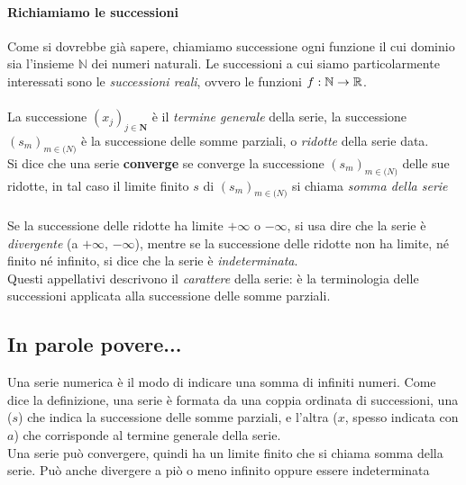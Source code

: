 \documentclass[12pt, a4paper, openany]{book}
\begin{document}
	\paragraph*{Richiamiamo le successioni}
	Come si dovrebbe già sapere, chiamiamo successione ogni funzione il cui dominio sia l'insieme $\mathbb{N}$ dei numeri naturali.
	Le successioni a cui siamo particolarmente interessati sono le \emph{successioni reali}, ovvero le funzioni $f : \mathbb{N} \rightarrow \mathbb{R}$.
	\paragraph*{}La successione $(x_j)_{j\in \mathbf{N}}$ è il \emph{termine generale} della serie, la successione $(s_m)_{m\in \mathbf(N)}$ è la successione delle somme parziali, o \emph{ridotte} della serie data.\\
	Si dice che una serie \textbf{converge} se converge la successione $(s_m)_{m\in \mathbf(N)}$ delle sue ridotte, in tal caso il limite finito $s$ di $(s_m)_{m\in \mathbf(N)}$ si chiama \emph{somma della serie}
	\paragraph*{}Se la successione delle ridotte ha limite $+ \infty$ o $- \infty$, si usa dire che la serie è \emph{divergente} (a $+ \infty$, $- \infty$), mentre se la successione delle ridotte non ha limite, né finito né infinito, si dice che la serie è \emph{indeterminata}.
	\\Questi appellativi descrivono il \emph{carattere} della serie: è  la terminologia delle successioni applicata alla successione delle somme parziali.

	\subsection*{In parole povere...}
	Una serie numerica è il modo di indicare una somma di infiniti numeri.
	Come dice la definizione, una serie è formata da una coppia ordinata di successioni, una ($s$) che indica la successione delle somme parziali, e l'altra ($x$, spesso indicata con $a$) che corrisponde al termine generale della serie.
	\\Una serie può convergere, quindi ha un limite finito che si chiama somma della serie. Può anche divergere a piò o meno infinito oppure essere indeterminata
\end{document}
